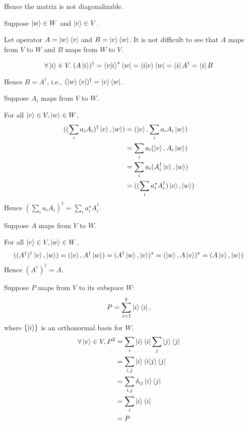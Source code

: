 \documentclass{homeworg}
\begin{document}
Hence the matrix is not diagonalizable.

\exercise*
Suppose $\ket{w}\in W$ and $\ket{v}\in V$.

Let operator $A=\ket{w}\bra{v}$ and $B=\ket{v}\bra{w}$. It is not difficult to see that $A$ maps from $V$ to $W$ and $B$ maps from $W$ to $V$.

\[\forall \ket{i}\in V.\;(A\ket{i})^\dagger=\braket{v|i}^\star\bra{w}=\braket{i|v}\bra{w}=\bra{i}A^\dagger=\bra{i}B\]

Hence $B=A^\dagger$, i.e., $(\ket{w}\bra{v})^\dagger=\ket{v}\bra{w}$.

\exercise*
Suppose $A_i$ maps from $V$ to $W$.

For all $\ket{v}\in V, \ket{w}\in W$,
\begin{align}
((\sum_i a_i A_i)^\dagger\ket{v},\ket{w})&=(\ket{v},\sum_i a_i A_i\ket{w})\nonumber\\
&=\sum_i a_i(\ket{v},A_i\ket{w})\nonumber\\
&=\sum_i a_i(A_i^\dagger\ket{v},\ket{w})\nonumber\\
&=((\sum_i a_i^\star A_i^\dagger)\ket{v},\ket{w})\nonumber
\end{align}
Hence $(\sum_i a_i A_i)^\dagger=\sum_i a_i^\star A_i^\dagger$.

\exercise*
Suppose $A$ maps from $V$ to $W$.

For all $\ket{v}\in V, \ket{w}\in W$,
\[
((A^\dagger)^\dagger\ket{v},\ket{w})=(\ket{v},A^\dagger\ket{w})=(A^\dagger\ket{w},\ket{v})^\star=(\ket{w},A\ket{v})^\star=(A\ket{v},\ket{w})
\]
Hence $(A^\dagger)^\dagger=A$.

\exercise*
Suppose $P$ maps from $V$ to its subspace $W$: \[P=\sum_{i=1}^k\ket{i}\bra{i},\]
where $\{\ket{i}\}$ is an orthonormal basis for $W$.
\begin{align}
    \forall \ket{v}\in V, P^2&=\sum_{i}\ket{i}\bra{i}\sum_{j}\ket{j}\bra{j}\nonumber\\
    &=\sum_{i,j}\ket{i}\braket{i|j}\bra{j}\nonumber\\
    &=\sum_{i,j}\delta_{ij}\ket{i}\bra{j}\nonumber\\
    &=\sum_{i}\ket{i}\bra{i}\nonumber\\
    &=P\nonumber
\end{align}
\end{document}
